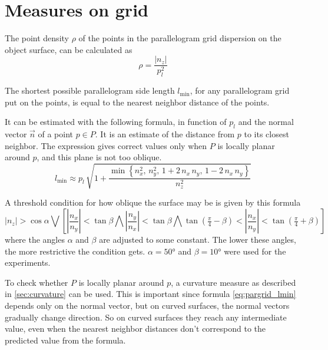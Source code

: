 \FloatBarrier

\section{Measures on grid}
The point density $\rho$ of the points in the parallelogram grid dispersion on the object surface, can be calculated as
\begin{equation}
\rho = \frac{| n_z |}{p^2_l}
\end{equation}

The shortest possible parallelogram side length $l_{\text{min}}$, for any parallelogram grid put on the points, is equal to the nearest neighbor distance of the points.

It can be estimated with the following formula, in function of $p_l$ and the normal vector $\vec{n}$ of a point $p \in P$. It is an estimate of the distance from $p$ to its closest neighbor. The expression gives correct values only when $P$ is locally planar around $p$, and this plane is not too oblique.
\begin{equation} \label{eq:pargrid_lmin}
l_{\text{min}} \approx p_l \, \sqrt{1 + \frac{\min \left\{
	n^2_x, \,
	n^2_y, \,
	1 + 2 \, n_x \, n_y, \,
	1 - 2 \, n_x \, n_y
\right\} }{n^2_z}}
\end{equation}

A threshold condition for how oblique the surface may be is given by this formula
\begin{equation} \label{eq:pargrid_lmin_cond}
|n_z| > \cos \alpha \bigvee
\left[
\left|\frac{n_x}{n_y}\right| < \tan \beta
\bigwedge \left|\frac{n_y}{n_x}\right| < \tan \beta
\bigwedge \tan \left(\tfrac{\pi}{4} - \beta\right) < \left|\frac{n_x}{n_y}\right| < \tan \left(\tfrac{\pi}{4} + \beta \right)
\right]
\end{equation}
where the angles $\alpha$ and $\beta$ are adjusted to some constant. The lower these angles, the more restrictive the condition gets. $\alpha = 50\si{\degree}$ and $\beta = 10\si{\degree}$ were used for the experiments.

To check whether $P$ is locally planar around $p$, a curvature measure as described in \ref{sec:curvature} can be used. This is important since formula \ref{eq:pargrid_lmin} depends only on the normal vector, but on curved surfaces, the normal vectors gradually change direction. So on curved surfaces they reach any intermediate value, even when the nearest neighbor distances don't correspond to the predicted value from the formula.

